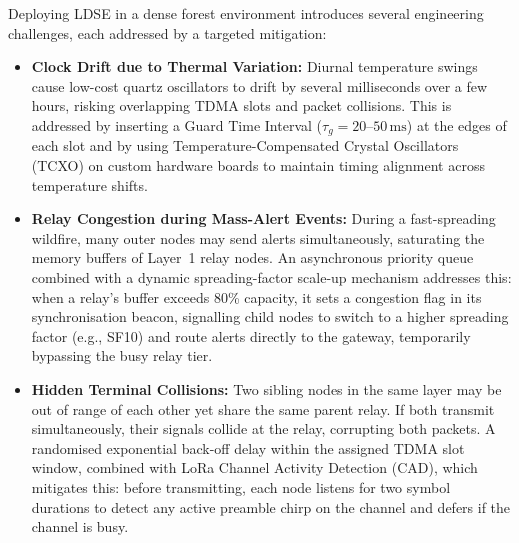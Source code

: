 Deploying LDSE in a dense forest environment introduces several engineering
challenges, each addressed by a targeted mitigation:

\begin{itemize}
  \item \textbf{Clock Drift due to Thermal Variation:} Diurnal temperature
        swings cause low-cost quartz oscillators to drift by several milliseconds
        over a few hours, risking overlapping TDMA slots and packet collisions.
        This is addressed by inserting a Guard Time Interval
        ($\tau_g = 20\text{--}50\,\text{ms}$) at the edges of each slot and by
        using Temperature-Compensated Crystal Oscillators (TCXO) on custom
        hardware boards to maintain timing alignment across temperature shifts.

  \item \textbf{Relay Congestion during Mass-Alert Events:} During a
        fast-spreading wildfire, many outer nodes may send alerts simultaneously,
        saturating the memory buffers of Layer~1 relay nodes. An asynchronous
        priority queue combined with a dynamic spreading-factor scale-up mechanism
        addresses this: when a relay's buffer exceeds 80\% capacity, it sets a
        congestion flag in its synchronisation beacon, signalling child nodes to
        switch to a higher spreading factor (e.g., SF10) and route alerts
        directly to the gateway, temporarily bypassing the busy relay tier.

  \item \textbf{Hidden Terminal Collisions:} Two sibling nodes in the same
        layer may be out of range of each other yet share the same parent relay.
        If both transmit simultaneously, their signals collide at the relay,
        corrupting both packets. A randomised exponential back-off delay within
        the assigned TDMA slot window, combined with LoRa Channel Activity
        Detection (CAD), which mitigates this: before transmitting, each node listens
        for two symbol durations to detect any active preamble chirp on the
        channel and defers if the channel is busy.
\end{itemize}